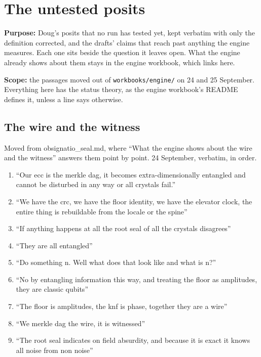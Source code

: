 \chapter{\texorpdfstring{The untested posits}{The untested posits}}
\label{chap:posits-24-september}

\textbf{Purpose:} Doug's posits that no run has tested yet, kept verbatim with only the definition corrected, and the drafts' claims that reach past anything the engine measures. Each one sits beside the question it leaves open. What the engine already shows about them stays in the engine workbook, which links here.

\textbf{Scope:} the passages moved out of \texttt{workbooks/\allowbreak{}engine/\allowbreak{}} on 24 and 25 September. Everything here has the status theory, as the engine workbook's README defines it, unless a line says otherwise.

\section{\texorpdfstring{The wire and the witness}{The wire and the witness}}

Moved from obsignatio\_\allowbreak{}seal.md, where “What the engine shows about the wire and the witness” answers them point by point. 24 September, verbatim, in order.

\begin{enumerate}
\item “Our ecc is the merkle dag, it becomes extra-dimensionally entangled and cannot be disturbed in any way or all crystals fail.”
\item “We have the crc, we have the floor identity, we have the elevator clock, the entire thing is rebuildable from the locale or the spine”
\item “If anything happens at all the root seal of all the crystals disagrees”
\item “They are all entangled”
\item “Do something n. Well what does that look like and what is n?”
\item “No by entangling information this way, and treating the floor as amplitudes, they are classic qubits”
\item “The floor is amplitudes, the knf is phase, together they are a wire”
\item “We merkle dag the wire, it is witnessed”
\item “The root seal indicates on field absurdity, and because it is exact it knows all noise from non noise”
\end{enumerate}

